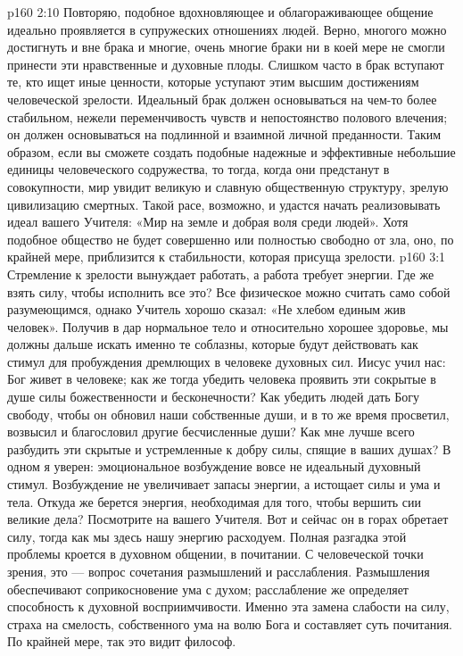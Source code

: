 \vs p160 2:10 \pc Повторяю, подобное вдохновляющее и облагораживающее общение идеально проявляется в супружеских отношениях людей. Верно, многого можно достигнуть и вне брака и многие, очень многие браки ни в коей мере не смогли принести эти нравственные и духовные плоды. Слишком часто в брак вступают те, кто ищет иные ценности, которые уступают этим высшим достижениям человеческой зрелости. Идеальный брак должен основываться на чем\hyp{}то более стабильном, нежели переменчивость чувств и непостоянство полового влечения; он должен основываться на подлинной и взаимной личной преданности. Таким образом, если вы сможете создать подобные надежные и эффективные небольшие единицы человеческого содружества, то тогда, когда они предстанут в совокупности, мир увидит великую и славную общественную структуру, зрелую цивилизацию смертных. Такой расе, возможно, и удастся начать реализовывать идеал вашего Учителя: «Мир на земле и добрая воля среди людей». Хотя подобное общество не будет совершенно или полностью свободно от зла, оно, по крайней мере, приблизится к стабильности, которая присуща зрелости.
\vs p160 3:1 Стремление к зрелости вынуждает работать, а работа требует энергии. Где же взять силу, чтобы исполнить все это? Все физическое можно считать само собой разумеющимся, однако Учитель хорошо сказал: «Не хлебом единым жив человек». Получив в дар нормальное тело и относительно хорошее здоровье, мы должны дальше искать именно те соблазны, которые будут действовать как стимул для пробуждения дремлющих в человеке духовных сил. Иисус учил нас: Бог живет в человеке; как же тогда убедить человека проявить эти сокрытые в душе силы божественности и бесконечности? Как убедить людей дать Богу свободу, чтобы он обновил наши собственные души, и в то же время просветил, возвысил и благословил другие бесчисленные души? Как мне лучше всего разбудить эти скрытые и устремленные к добру силы, спящие в ваших душах? В одном я уверен: эмоциональное возбуждение вовсе не идеальный духовный стимул. Возбуждение не увеличивает запасы энергии, а истощает силы и ума и тела. Откуда же берется энергия, необходимая для того, чтобы вершить сии великие дела? Посмотрите на вашего Учителя. Вот и сейчас он в горах обретает силу, тогда как мы здесь нашу энергию расходуем. Полная разгадка этой проблемы кроется в духовном общении, в почитании. С человеческой точки зрения, это --- вопрос сочетания размышлений и расслабления. Размышления обеспечивают соприкосновение ума с духом; расслабление же определяет способность к духовной восприимчивости. Именно эта замена слабости на силу, страха на смелость, собственного ума на волю Бога и составляет суть почитания. По крайней мере, так это видит философ.
